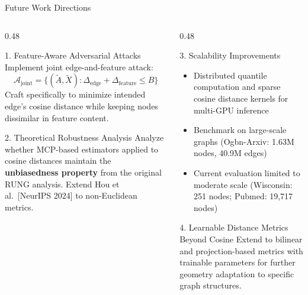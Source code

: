 \documentclass[aspectratio=169]{beamer}
\begin{document}
\begin{frame}{Future Work Directions}
  \tiny
  \begin{columns}[T]
    \begin{column}{0.48\textwidth}
      \begin{block}{1. Feature-Aware Adversarial Attacks}
        Implement joint edge-and-feature attack:
        \[
          \mathcal{A}_\text{joint} = \{(\tilde{A}, \tilde{X}) : \Delta_\text{edge} + \Delta_\text{feature} \leq B\}
        \]
        Craft specifically to minimize intended edge's cosine distance while keeping nodes dissimilar in feature content.
      \end{block}
      \vspace{6pt}
      \begin{block}{2. Theoretical Robustness Analysis}
        Analyze whether MCP-based estimators applied to cosine distances maintain the \textbf{unbiasedness property} from the original RUNG analysis. Extend Hou et al.\ [NeurIPS 2024] to non-Euclidean metrics.
      \end{block}
    \end{column}
    \begin{column}{0.48\textwidth}
      \begin{block}{3. Scalability Improvements}
        \begin{itemize}
          \item Distributed quantile computation and sparse cosine distance kernels for multi-GPU inference
          \item Benchmark on large-scale graphs (Ogbn-Arxiv: 1.63M nodes, 40.9M edges)
          \item Current evaluation limited to moderate scale (Wisconsin: 251 nodes; Pubmed: 19,717 nodes)
        \end{itemize}
      \end{block}
      \vspace{6pt}
      \begin{block}{4. Learnable Distance Metrics Beyond Cosine}
        Extend to bilinear and projection-based metrics with trainable parameters for further geometry adaptation to specific graph structures.
      \end{block}
    \end{column}
  \end{columns}
\end{frame}

\end{document}
